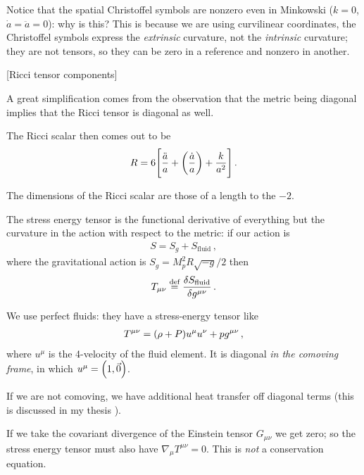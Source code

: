 \documentclass[main.tex]{subfiles}
\begin{document}
Notice that the spatial Christoffel symbols are nonzero even in Minkowski (\(k=0\), \(\dot{a} = \ddot{a} =  0\)): why is this?
This is because we are using curvilinear coordinates, the Christoffel symbols express the \emph{extrinsic} curvature, not the \emph{intrinsic} curvature; they are not tensors, so they can be zero in a reference and nonzero in another. 

[Ricci tensor components]

A great simplification comes from the observation that the metric being diagonal implies that the Ricci tensor is diagonal as well. 

The Ricci scalar then comes out to be 
%
\begin{align}
R = 6 \qty[\frac{\ddot{a}}{a} + \qty(\frac{\dot{a}}{a}) + \frac{k}{a^2}]
\,.
\end{align}

The dimensions of the Ricci scalar are those of a length to the \(-2\). 

The stress energy tensor is the functional derivative of everything but the curvature in the action with respect to the metric: if our action is 
%
\begin{align}
S = S_{g} + S_{\text{fluid}}
\,,
\end{align}
%
where the gravitational action is \(S_{g} = M_p^2 R \sqrt{-g} /2 \) then 
%
\begin{align}
T_{\mu \nu } \overset{\text{def}}{=} \fdv{S_{\text{fluid}}}{g^{\mu \nu }}
\,.
\end{align}


We use perfect fluids: they have a stress-energy tensor like 
%
\begin{align}
T^{\mu \nu } =  \qty(\rho + P) u^{\mu } u^{\nu } + p g^{\mu \nu }
\,,
\end{align}
%
where \(u^{\mu }\) is the 4-velocity of the fluid element. 
It is diagonal \emph{in the comoving frame}, in which \(u^{\mu } = \qty(1, \vec{0})\).

If we are not comoving, we have additional heat transfer off diagonal terms (this is discussed in my thesis \cite[section 4.2]{tissinoRelativisticNonidealFlows2019}). 

If we take the covariant divergence of the Einstein tensor \(G_{\mu \nu }\) we get zero; so the stress energy tensor must also have \(\nabla_{\mu} T^{\mu \nu }=0\). 
This is \emph{not} a conservation equation. 
\end{document}

